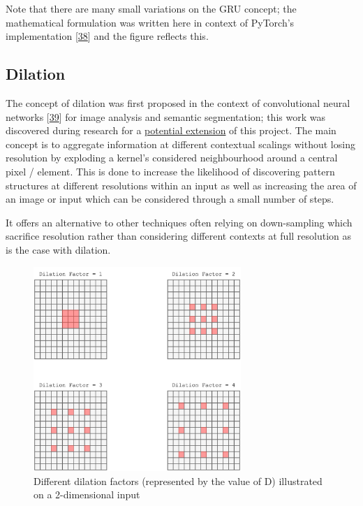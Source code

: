 \documentclass[12pt,]{article}
\begin{document}
Note that there are many small variations on the GRU concept; the
mathematical formulation was written here in context of PyTorch's
implementation {[}\protect\hyperlink{ref-pytorchgru}{38}{]} and the
figure reflects this.

\hypertarget{dilation}{%
\subsection{Dilation}\label{dilation}}

The concept of dilation was first proposed in the context of
convolutional neural networks
{[}\protect\hyperlink{ref-yu2015multi}{39}{]} for image analysis and
semantic segmentation; this work was discovered during research for a
\protect\hyperlink{sentimentalinputfromimages}{potential extension} of
this project. The main concept is to aggregate information at different
contextual scalings without losing resolution by exploding a kernel's
considered neighbourhood around a central pixel / element. This is done
to increase the likelihood of discovering pattern structures at
different resolutions within an input as well as increasing the area of
an image or input which can be considered through a small number of
steps.

It offers an alternative to other techniques often relying on
down-sampling which sacrifice resolution rather than considering
different contexts at full resolution as is the case with dilation.

\begin{figure}
\centering
\includegraphics[width=0.7\textwidth,height=\textheight]{Images/dilation2d.png}
\caption{Different dilation factors (represented by the value of D)
illustrated on a 2-dimensional input}
\end{figure}
\end{document}
